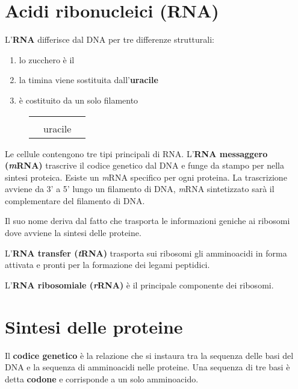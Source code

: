 
\section{Acidi ribonucleici (RNA)}
\noindent L'\textbf{\acf{RNA}} differisce dal DNA per tre differenze strutturali:
\begin{enumerate}
	\item lo zucchero è il 
	\item la timina viene sostituita dall'\textbf{uracile}
	\item è costituito da un solo filamento
\end{enumerate}

\begin{figure}[H]
	\centering
	\setlength{\tabcolsep}{.8cm}
	\renewcommand{\arraystretch}{2}
	\begin{NiceTabular}{ccc}
		 &  &                      \\
		   & uracile              &  \\
	\end{NiceTabular}
\end{figure}

Le cellule contengono tre tipi principali di \ac{RNA}. L'\textbf{RNA messaggero (\textit{m}RNA)} trascrive il codice genetico dal DNA e funge da stampo per nella sintesi proteica. Esiste un \textit{m}RNA specifico per ogni proteina.
La trascrizione avviene da 3' a 5' lungo un filamento di DNA, \textit{m}RNA sintetizzato sarà il complementare del filamento di DNA.

Il suo nome deriva dal fatto che trasporta le informazioni geniche ai ribosomi dove avviene la sintesi delle proteine.

L'\textbf{RNA transfer (\textit{t}RNA)} trasporta sui ribosomi gli amminoacidi in forma attivata e pronti per la formazione dei legami peptidici.

L'\textbf{RNA ribosomiale (\textit{r}RNA)} è il principale componente dei ribosomi.


\section{Sintesi delle proteine}
Il \textbf{codice genetico} è la relazione che si instaura tra la sequenza delle basi del DNA e la sequenza di amminoacidi nelle proteine. Una sequenza di tre basi è detta \textbf{codone} e corrisponde a un solo amminoacido.

